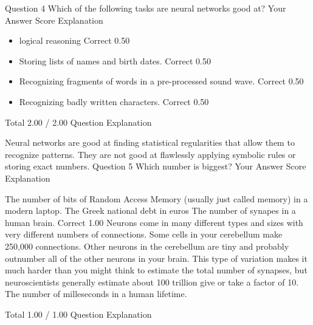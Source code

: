 Question 4
Which of the following tasks are neural networks good at?
Your Answer		Score	Explanation
\begin{itemize}
\item logical reasoning	Correct	0.50	
\item Storing lists of names and birth dates.	Correct	0.50	
\item Recognizing fragments of words in a pre-processed sound wave.	Correct	0.50	
\item Recognizing badly written characters.	Correct	0.50	
\end{itemize}
Total		2.00 / 2.00	
Question Explanation

Neural networks are good at finding statistical regularities that allow them to recognize patterns. 
They are not good at flawlessly applying symbolic rules or storing exact numbers.
Question 5
Which number is biggest?
Your Answer		Score	Explanation

The number of bits of Random Access Memory (usually just called memory) in a modern laptop.			
The Greek national debt in euros			
The number of synapes in a human brain.	Correct	1.00	Neurons come in many different types and sizes with very different numbers of connections. Some cells in your cerebellum make 250,000 connections. Other neurons in the cerebellum are tiny and probably outnumber all of the other neurons in your brain. This type of variation makes it much harder than you might think to estimate the total number of synapses, but neuroscientists generally estimate about 100 trillion give or take a factor of 10.
The number of milleseconds in a human lifetime.			

Total		1.00 / 1.00	
Question Explanation


